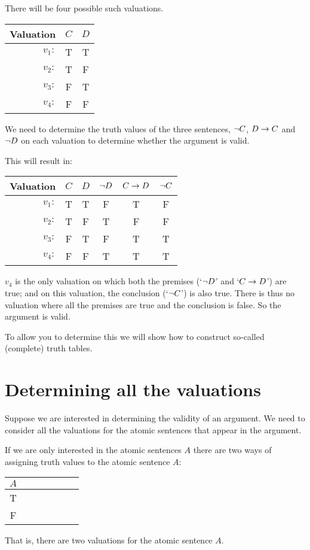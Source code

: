 There will be four possible such valuations. 
\begin{center}
	\begin{tabular}{rcc}
		Valuation&$C$&$D$\\\hline
		$v_1:$&T & T \\
		$v_2:$&T & F \\
		$v_3:$&F & T \\
		$v_4:$&F & F \\
	\end{tabular}
\end{center}

We need to determine the truth values of the three sentences, $\neg C$, $D\rightarrow C$ and $\neg D$ on each valuation to determine whether the argument is valid. 

This will result in:
 \begin{center}
	\begin{tabular}{rcc||c|c||c}
		Valuation&$C$&$D$&$\neg D$&$C\rightarrow D$&$\neg C$\\\hline
		$v_1:$&T & T & F & T & F\\
		$v_2:$&T & F & T & F & F\\
		$v_3:$&F & T & F & T & T\\
		$v_4:$&F & F & {T}& {T} & {T}
	\end{tabular}
\end{center}

$v_4$ is the only valuation on which both the premises (`$\neg D$' and `$C\rightarrow D$') are true; and on this valuation, the conclusion (`$\neg C$') is also true. 
There is thus no valuation where all the premises are true and the conclusion is false. So the argument is valid. 

To allow you to determine this we will show how to construct so-called (complete) truth tables. 
 
\section{Determining all the valuations}

Suppose we are interested in determining the validity of an argument. We need to consider all the valuations for the atomic sentences that appear in the argument. 


If we are only interested in the atomic sentences $A$ there are two ways of assigning truth values to the atomic sentence $A$:
\begin{center}
	\begin{tabular}{ccccccc}
		$A$\\\hline
		T\\
		F 
	\end{tabular}
\end{center}
That is, there are two valuations for the atomic sentence $A$. 

